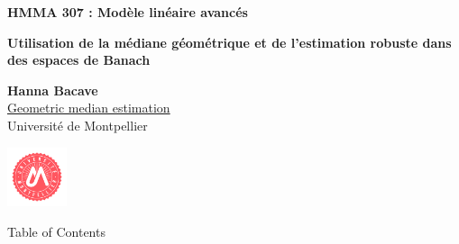 \documentclass[unknownkeysallowed]{beamer}
\begin{document}



\begin{frame}
\bigskip
\bigskip
\begin{center}{
\LARGE\color{marron}
\textbf{HMMA 307 : Modèle linéaire avancés}
\textbf{ }\\
\vspace{0.5cm}
}

\color{marron}
\textbf{Utilisation de la médiane géométrique et de l’estimation robuste dans des espaces de Banach}
\end{center}

\vspace{0.25cm}

\begin{center}
\textbf{Hanna Bacave \\}
\faGithub\href{https://github.com/hannabacave/geometric_median_estimation}{Geometric median estimation}
\\
\vspace{0.5cm}
Université de Montpellier \\
\end{center}

\centering
\includegraphics[width=0.13\textwidth]{Logo_université_montpellier.png}

\end{frame}






\begin{frame}{Table of Contents}
\tableofcontents[hideallsubsections]
\end{frame}
\end{document}
